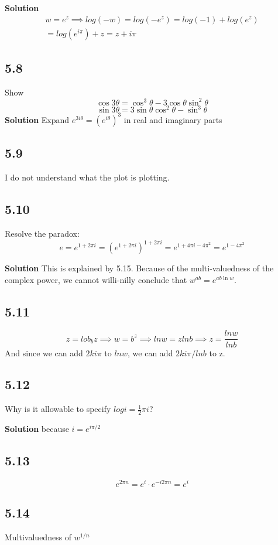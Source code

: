 \documentclass[]{article}
\begin{document}
\textbf{Solution}
\begin{eqnarray}
w = e^z \implies log(-w) = log(-e^z) = log(-1)+log(e^z) \\
= log(e^{i\pi})+z = z + i\pi
\end{eqnarray}


\subsection*{5.8}
Show 
$$
\cos 3\theta = \cos^3 \theta - 3\cos\theta \sin^2 \theta 
$$
$$
\sin 3\theta = 3\sin\theta \cos^2 \theta - \sin^3 \theta
$$
\textbf{Solution}
Expand $e^{3i\theta} = (e^{i\theta})^3$ in real and imaginary parts

\subsection*{5.9}
I do not understand what the plot is plotting. 

\subsection*{5.10}
Resolve the paradox: 
$$
e = e^{1+2\pi i} = (e^{1+2\pi i})^{1+2\pi i} = e^{1+4\pi i-4\pi^2} = e^{1-4\pi^2}
$$

\textbf{Solution}
This is explained by 5.15. Because of the multi-valuedness of the complex power, we cannot willi-nilly conclude that  $w^{ab} = e^{ab \ln w}$.

\subsection*{5.11}
$$
z = lob_b z \implies w = b^z \implies lnw = zlnb \implies z = \frac{lnw}{lnb}
$$
And since we can add $2ki\pi$ to $lnw$, we can add $2ki\pi/lnb$ to z.

\subsection*{5.12}
Why is it allowable to specify $logi = \frac{1}{2}\pi i$?

\textbf{Solution} because $i = e^{i\pi/2}$

\subsection*{5.13}

$$
e^{2\pi n} = e^i \cdot e^{-i2\pi n} = e^i
$$
 
 
\subsection*{5.14}
Multivaluedness of $w^{1/n}$
\end{document}
